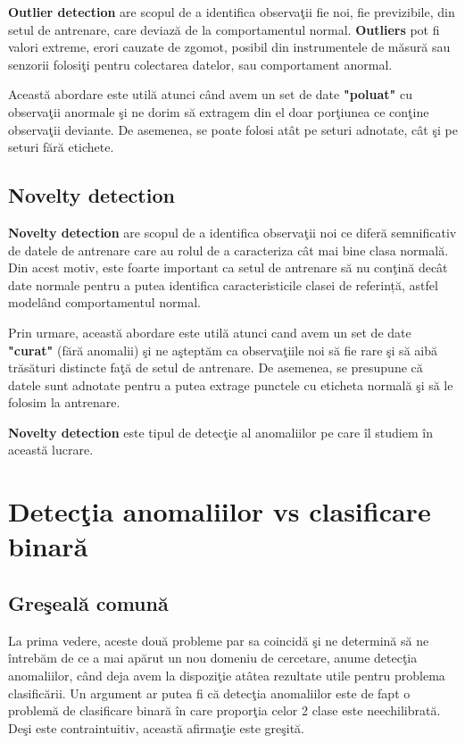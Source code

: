 \textbf{Outlier detection} are scopul de a identifica observaţii fie noi,
fie previzibile, din setul de antrenare, care deviază de la 
comportamentul normal. 
\textbf{Outliers} pot fi valori extreme, erori cauzate 
de zgomot, posibil din instrumentele de măsură sau senzorii folosiţi 
pentru colectarea datelor, sau comportament anormal.

Această abordare este utilă atunci când avem un set de date \textbf{"poluat"} cu 
observaţii anormale şi ne dorim să extragem din el doar porţiunea ce conţine 
observaţii deviante. De asemenea, se poate folosi atât pe seturi adnotate, cât 
şi pe seturi fără etichete.

\subsection{Novelty detection}

\textbf{Novelty detection} are scopul de a identifica observaţii noi 
ce diferă semnificativ de datele de antrenare care au rolul de a 
caracteriza cât mai bine clasa normală. Din acest motiv, este foarte 
important ca setul de antrenare să nu conţină
decât date normale pentru a putea identifica caracteristicile clasei de referință,
astfel modelând comportamentul normal.

Prin urmare, această abordare este utilă atunci cand avem un 
set de date \textbf{"curat"} (fără 
anomalii) şi ne aşteptăm ca observaţiile noi să fie rare şi să aibă trăsături
distincte faţă de setul de antrenare. De asemenea, se presupune că datele sunt adnotate 
pentru a putea extrage punctele cu eticheta normală şi să le folosim la antrenare.

\textbf{Novelty detection} este tipul de detecţie al anomaliilor pe care îl studiem în 
această lucrare.

\section{Detecţia anomaliilor vs clasificare binară}

\subsection{Greşeală comună}

La prima vedere, aceste două probleme par sa coincidă şi ne determină
să ne întrebăm de ce a mai apărut un nou domeniu de cercetare, anume detecţia
anomaliilor, când deja avem la dispoziţie atâtea rezultate utile pentru 
problema clasificării. Un argument ar putea fi că 
detecţia anomaliilor este de fapt o problemă de clasificare binară în care proporţia
celor 2 clase este neechilibrată. Deşi este contraintuitiv, această 
afirmaţie este greşită.

